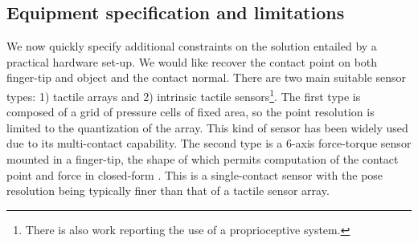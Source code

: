 



\subsection{Equipment specification and limitations}
\label{sec:limitations}

We now quickly specify additional constraints on the solution entailed by a practical hardware set-up. We would like recover the contact point on both finger-tip and object and the contact normal. There are two main suitable sensor types: 1) tactile arrays and 2) intrinsic tactile sensors\footnote{There is also work reporting the use of a proprioceptive system.}. The first type is composed of a grid of pressure cells of fixed area, so the point resolution is limited to the quantization of the array. This kind of sensor has been widely used due to its multi-contact capability. %
The second type is a $6$-axis force-torque sensor mounted in a finger-tip, the shape of which permits computation of the contact point and force in closed-form \cite{Bicchi1993Contact}. This is a single-contact sensor with the pose resolution being typically finer than that of a tactile sensor array.

